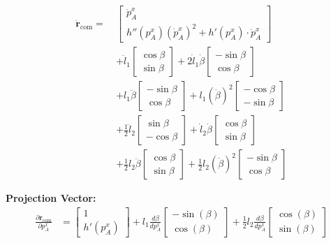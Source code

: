 \documentclass[10pt]{article}
\begin{document}
\begin{minipage}[t]{0.65\textwidth}
\begin{align*}
\ddot{\mathbf{r}}_{\text{com}} =\ &
\begin{bmatrix}
\ddot{p}_A^x \\
h''(p_A^x)(\dot{p}_A^x)^2 + h'(p_A^x) \cdot \ddot{p}_A^x
\end{bmatrix} \\
&+
\ddot{l}_1
\begin{bmatrix}
\cos\beta \\
\sin\beta
\end{bmatrix}
+
2 \dot{l}_1 \dot{\beta}
\begin{bmatrix}
-\sin\beta \\
\cos\beta
\end{bmatrix} \\
&+
l_1 \ddot{\beta}
\begin{bmatrix}
-\sin\beta \\
\cos\beta
\end{bmatrix}
+
l_1 (\dot{\beta})^2
\begin{bmatrix}
-\cos\beta \\
-\sin\beta
\end{bmatrix} \\
&+
\frac{1}{2} \ddot{l}_2
\begin{bmatrix}
\sin\beta \\
-\cos\beta
\end{bmatrix}
+
\dot{l}_2 \dot{\beta}
\begin{bmatrix}
\cos\beta \\
\sin\beta
\end{bmatrix} \\
&+
\frac{1}{2} l_2 \ddot{\beta}
\begin{bmatrix}
\cos\beta \\
\sin\beta
\end{bmatrix}
+
\frac{1}{2} l_2 (\dot{\beta})^2
\begin{bmatrix}
-\sin\beta \\
\cos\beta
\end{bmatrix}
\end{align*}

\textbf{Projection Vector: }
\begin{align*}
\frac{\partial \mathbf{r}_{\mathrm{com}}}{\partial p_A^x} &= 
\begin{bmatrix}
1 \\
h'(p_A^x)
\end{bmatrix}
+
l_1 \frac{d\beta}{dp_A^x}
\begin{bmatrix}
- \sin(\beta) \\
\cos(\beta)
\end{bmatrix}
+
\frac{1}{2} l_2 \frac{d\beta}{dp_A^x}
\begin{bmatrix}
\cos(\beta) \\
\sin(\beta)
\end{bmatrix}
\end{align*}


\end{minipage}
\end{document}
